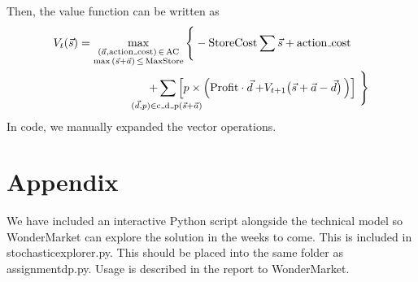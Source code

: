 \documentclass[11pt,a4paper]{article}
\begin{document}
Then, the value function can be written as 
\begin{align*}
    V_{t}(\vec s) &= 
    \max_{ \substack{(\vec a, \mathrm{action{\mathunderscore}cost}) \,\in\, \mathrm{AC} \\ \max \,(\vec s + \vec a)\, \le\, \mathrm{MaxStore} } }\Bigg\{
        -\mathrm{StoreCost}\sum\vec s  + \mathrm{action{\mathunderscore}cost}\\ 
        &  \underset{(\vec d, p) \in \mathrm{c{\mathunderscore}d{\mathunderscore}p}(\vec s + \vec a)}{\qquad\qquad \quad \quad + \sum \Big[p\times \Big( \mathrm{Profit} \cdot\vec d}   
         + V_{t+1} \big(\vec s + \vec a - \vec d\big)\,\Big) \Big]\,\,\Bigg\}
\end{align*}
In code, we manually expanded the vector operations.

\part{Appendix}
We have included an interactive Python script alongside the technical model 
so WonderMarket can explore the solution in the weeks to come. This is included
in stochastic{\textunderscore}explorer.py. This should be placed into the same 
folder as assignment{\textunderscore}dp.py. Usage is described in the report 
to WonderMarket.
\end{document}
